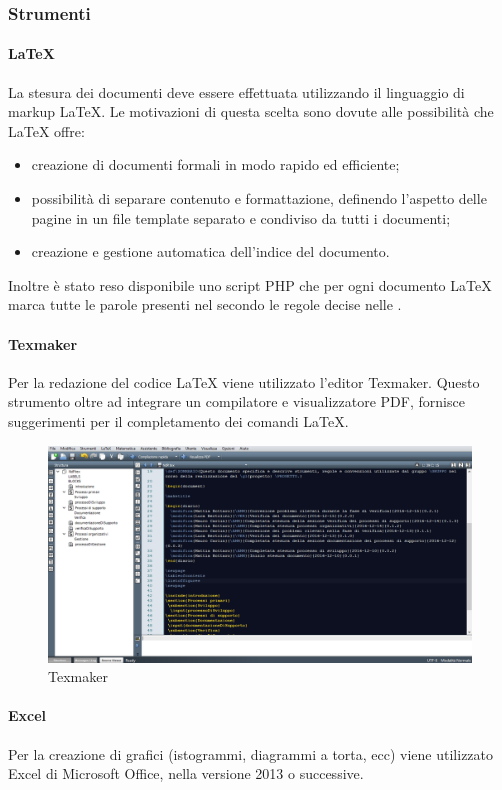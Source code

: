 \subsubsection{Strumenti}
\label{sec:Strumenti}
 \paragraph{\LaTeX}
La stesura dei documenti deve essere effettuata utilizzando il linguaggio di markup \LaTeX. Le motivazioni di questa scelta sono dovute alle possibilità che \LaTeX{} offre:
\begin{itemize}
	\item creazione di documenti formali in modo rapido ed efficiente;
	\item possibilità di separare contenuto e formattazione, definendo l'aspetto delle pagine in un file
template separato e condiviso da tutti i documenti;
	\item creazione e gestione automatica dell'indice del documento.
\end{itemize}
Inoltre è stato reso disponibile uno script PHP che per ogni documento \LaTeX{} marca tutte  le parole presenti nel \Gldoc{} secondo le regole decise nelle \NPdoc.
 \paragraph{Texmaker}
Per la redazione del codice \LaTeX{} viene utilizzato l'editor Texmaker. Questo
strumento oltre ad integrare un compilatore e visualizzatore PDF, fornisce suggerimenti per il completamento dei comandi \LaTeX.
\begin{figure}[h]
\centering
\includegraphics[scale=0.4]{img/texm.png}
\caption{Texmaker}\label{sec:Figura3}
\end{figure}
 \paragraph{Excel}
Per la creazione di grafici (istogrammi, diagrammi a torta, ecc) viene utilizzato Excel di Microsoft Office, nella versione 2013 o successive.